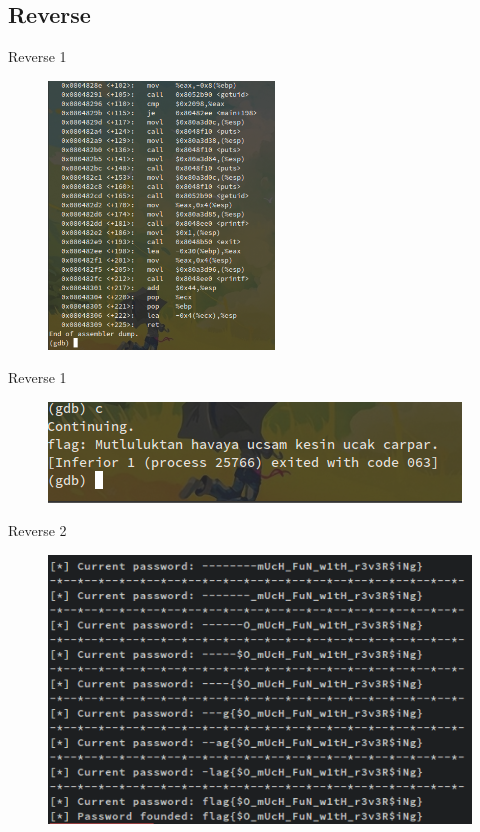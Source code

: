 \documentclass[compress]{beamer}
\begin{document}
\subsection{Reverse}

\begin{frame}{Reverse 1}
      \begin{figure}
          \centering
          \includegraphics[height=2.8in]{images/r11.png}
      \end{figure}
\end{frame}

\begin{frame}{Reverse 1}
      \begin{figure}
          \centering
          \includegraphics[width=\textwidth]{images/r12.png}
      \end{figure} 
\end{frame}

\begin{frame}{Reverse 2}
	\begin{figure}
		\centering
		\includegraphics[width=\textwidth]{images/r21.png}
	\end{figure}
\end{frame}
\end{document}
